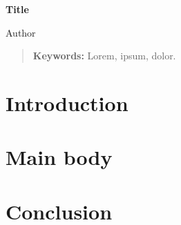 



    \begin{center}
        \Large\textbf{\sffamily Title}
        
        \vspace{0.5cm}

        \large{Author}
    \end{center}
    
    \setlength{\parindent}{1.25cm}
    \onehalfspacing

    \begin{abstract}
        \normalsize
        \singlespacing
        \noindent \lipsum[1]  
        \vspace{0.5cm}
        
        \noindent \textbf{Keywords:} Lorem, ipsum, dolor.
    \end{abstract}
    
    \section*{Introduction}    
    
    \section*{Main body}
    
    \section*{Conclusion}
    

    \small
    
    

